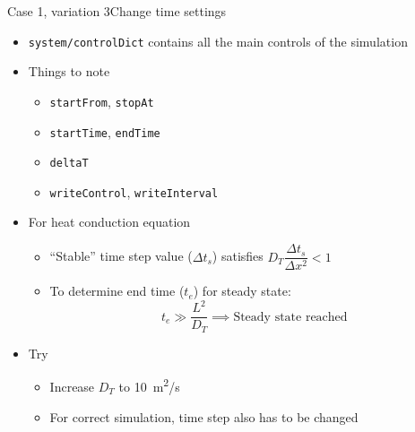\begin{frame}{Case 1, variation 3}{Change time settings}
    \begin{itemize}
        \setitemsep{1em}
        \item \texttt{system/controlDict} contains all the main controls of the simulation
        \item Things to note
        \begin{itemize}
            \item \texttt{startFrom}, \texttt{stopAt}
            \item \texttt{startTime}, \texttt{endTime}
            \item \texttt{deltaT}
            \item \texttt{writeControl}, \texttt{writeInterval}
        \end{itemize}
        \item For heat conduction equation
        \begin{itemize}
            \item ``Stable'' time step value ($\Delta t_s$) satisfies $D_T \dfrac{\Delta t_s}{\Delta x^2} < 1$
            \item To determine end time ($t_e$) for steady state:
            \begin{equation*}
                t_e \gg \frac{L^2}{D_T} \implies \text{Steady state reached}
            \end{equation*}
        \end{itemize}
        \item Try
        \begin{itemize}
            \item Increase $D_T$ to \qty{10}{m^2/s}
            \item For correct simulation, time step also has to be changed
        \end{itemize}
    \end{itemize}
\end{frame}

